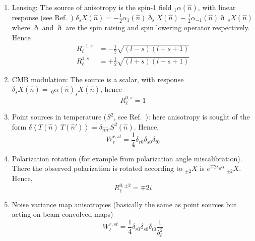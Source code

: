 \documentclass[reprint,prd, superscriptaddress, tightenlines, longbibliography, nofootinbib, eqsecnum, amsfonts, amsmath, floatfix, notitlepage, twocolumn]{revtex4-1}
\newcommand{\av}[1]{\left\langle #1 \right\rangle}
\newcommand{\hn}[0]{\hat n}
\begin{document}
\begin{enumerate}
	\item Lensing\cite{Okamoto:2003zw}: The source of anisotropy is the spin-1 field $_1\alpha(\hn)$, with linear response (see Ref.~\cite{Challinor:2002cd})
	$\delta _sX(\hn) =  -\frac 12 \alpha_1(\hn) \bar \eth _{s}X(\hn) - \frac 12 \alpha_{-1}(\hn) \eth \:_sX(\hn) $
	where $\eth$ and $\bar \eth$ are the spin raising and spin lowering operator respectively. Hence
	\begin{equation}
	\begin{split}	
		R_\ell^{-1, s} &=- \frac 12\sqrt{ (l - s) (l + s + 1) } \\
		R_\ell^{1, s} &= +\frac12\sqrt{ (l + s) (l - s + 1) }
	\end{split}
	\end{equation}
	\item CMB modulation: The source is a scalar, with response $\delta _sX(\hn) = \:_0\alpha(\hn) _{s}X(\hn)	$, hence
	\begin{equation} 
	R_\ell^{0,s} = 1
	\end{equation}
	\item Point sources in temperature ($S^2$, see Ref.~\cite{Osborne:2013nna}): here anisotropy is sought of the form
	$\delta  \av{T(\hn) \:T(\hn')} = \delta_{\hat n\hat n'}S^2(\hn)$. Hence,
	\begin{equation}
	W^{r, st}_\ell = \frac 14\delta_{r0}\delta_{s0}\delta_{t0} 
	\end{equation}
	\item Polarization rotation (for example from polarization angle miscalibration). There the observed polarization is rotated according to $_{\pm 2} X$ is $e^{\mp 2i \:_{0}\alpha} \: _{\pm 2}X$. Hence,
	\begin{equation}
		 R_\ell^{0, \pm 2} = \mp 2i
	\end{equation}
	\item Noise variance map anisotropies (basically the same as point sources but acting on beam-convolved maps)	\begin{equation}
	W^{r, st}_\ell = \frac 14\delta_{r0}\delta_{s0}\delta_{t0}  \frac{1}{b_\ell^2}
	\end{equation}
\end{enumerate}
\end{document}

